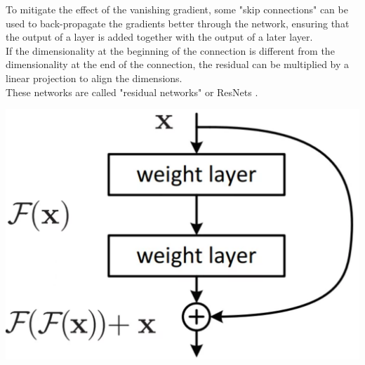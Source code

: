 \begin{minipage}{\linewidth}
    \vspace{0.1cm}
    \begin{minipage}{0.55\linewidth}
        To mitigate the effect of the vanishing gradient, some "skip connections" can be used to back-propagate the gradients better through the network, ensuring that the output of a layer is added together with the output of a later layer.\\
        If the dimensionality at the beginning of the connection is different from the dimensionality at the end of the connection, the residual can be multiplied by a linear projection to align the dimensions.\\
        These networks are called "residual networks" or ResNets \cite{He2015DeepRecognition}.
    \end{minipage}
    \hfill
    \begin{minipage}{0.4\linewidth}
        \centering
        \includegraphics[width=1\linewidth]{fig/chap05-stats/res.png}
        \label{fig:resnet}
    \end{minipage}
\end{minipage}


